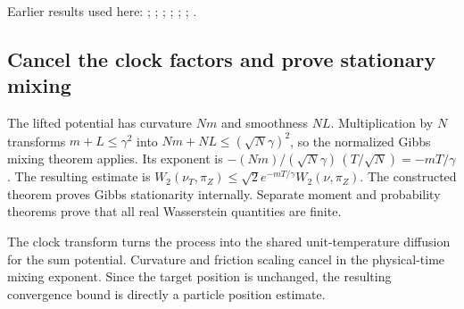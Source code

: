 \documentclass[11pt,a4paper]{report}
\begin{document}
Earlier results used here: \cite[Section~3.1.1]{LangevinLean2026IPLA}; \cite[Section~3.1.4]{LangevinLean2026IPLA}; \cite[Section~3.17.1]{LangevinLean2026Kinetic}; \cite[Section~3.19.1]{LangevinLean2026Kinetic}; \cite[Section~3.33.1]{LangevinLean2026Kinetic}; \cite[Section~3.53.1]{LangevinLean2026Kinetic}; \cite[Section~3.58.2]{LangevinLean2026Kinetic}.
\subsection{\texorpdfstring{Cancel the clock factors and prove stationary mixing}{Cancel the clock factors and prove stationary mixing}}
\label{report-step-KIPLMC-Continuous-lean-3}


The lifted potential has curvature \(Nm\) and smoothness \(NL\). Multiplication by \(N\) transforms \(m+L\le\gamma^2\) into \(Nm+NL\le(\sqrt N\gamma)^2\), so the normalized Gibbs mixing theorem applies. Its exponent is \(-(Nm)/(\sqrt N\gamma)\,(T/\sqrt N)=-mT/\gamma\). The resulting estimate is \(W_2(\nu_T,\pi_Z)\le\sqrt2e^{-mT/\gamma}W_2(\nu,\pi_Z)\). The constructed theorem proves Gibbs stationarity internally. Separate moment and probability theorems prove that all real Wasserstein quantities are finite.



The clock transform turns the process into the shared unit-temperature diffusion for the sum potential. Curvature and friction scaling cancel in the physical-time mixing exponent. Since the target position is unchanged, the resulting convergence bound is directly a particle position estimate.
\end{document}
